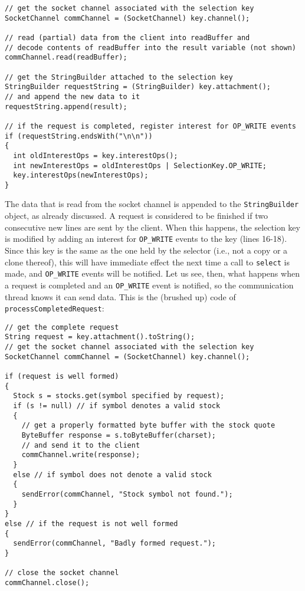 \documentclass[a4paper,10pt]{article}
\begin{document}
\begin{lstlisting}
// get the socket channel associated with the selection key
SocketChannel commChannel = (SocketChannel) key.channel();

// read (partial) data from the client into readBuffer and
// decode contents of readBuffer into the result variable (not shown)
commChannel.read(readBuffer);

// get the StringBuilder attached to the selection key
StringBuilder requestString = (StringBuilder) key.attachment();
// and append the new data to it
requestString.append(result);

// if the request is completed, register interest for OP_WRITE events
if (requestString.endsWith("\n\n"))
{
  int oldInterestOps = key.interestOps(); 
  int newInterestOps = oldInterestOps | SelectionKey.OP_WRITE;
  key.interestOps(newInterestOps);
}
\end{lstlisting}

The data that is read from the socket channel is appended to the \texttt{StringBuilder} object, as already discussed. A
request is considered to be finished if two consecutive new lines are sent by the client. When this happens, the selection
key is modified by adding an interest for \texttt{OP\_WRITE} events to the key (lines 16-18). Since this key is the same as the one held by
the selector (i.e., not a copy or a clone thereof), this will have immediate effect the next time a call to \texttt{select}
is made, and \texttt{OP\_WRITE} events will be notified. Let us see, then, what happens when a request is completed
and an \texttt{OP\_WRITE} event is notified, so the communication thread knows it can send data. This is the (brushed up)
code of \texttt{processCompletedRequest}:

\begin{lstlisting}
// get the complete request
String request = key.attachment().toString();
// get the socket channel associated with the selection key
SocketChannel commChannel = (SocketChannel) key.channel();

if (request is well formed)
{
  Stock s = stocks.get(symbol specified by request);
  if (s != null) // if symbol denotes a valid stock
  {
    // get a properly formatted byte buffer with the stock quote
    ByteBuffer response = s.toByteBuffer(charset);
    // and send it to the client
    commChannel.write(response);
  }
  else // if symbol does not denote a valid stock
  {
    sendError(commChannel, "Stock symbol not found.");
  }
}
else // if the request is not well formed
{
  sendError(commChannel, "Badly formed request.");
}

// close the socket channel
commChannel.close();
\end{lstlisting}
\end{document}
